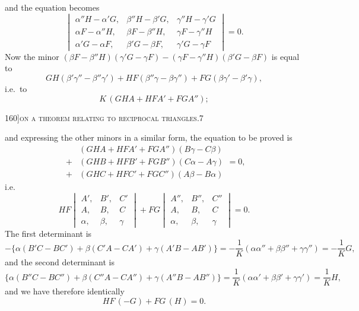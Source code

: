 \documentclass[11pt]{article}
\begin{document}
and the equation becomes
\[
\begin{vmatrix}
\alpha''H - \alpha'G, & \beta''H - \beta'G, & \gamma''H - \gamma'G\\
\alpha F - \alpha''H, & \beta F - \beta''H, & \gamma F - \gamma''H\\
\alpha'G - \alpha F, & \beta'G - \beta F, & \gamma'G - \gamma F
\end{vmatrix} = 0.
\]
Now the minor $(\beta F - \beta''H)(\gamma'G - \gamma F) - (\gamma F - \gamma''H)(\beta'G - \beta F)$ is equal to
\[
GH(\beta'\gamma'' - \beta''\gamma') + HF(\beta''\gamma - \beta\gamma'') + FG(\beta\gamma' - \beta'\gamma),
\]
i.e.\ to
\[
K\,(GHA + HFA' + FGA'');
\]

\newpage

\begin{center}
\small 160]\hfill\textsc{on a theorem relating to reciprocal triangles.}\hfill\textsc{7}
\end{center}

\medskip

\noindent and expressing the other minors in a similar form, the equation to be proved is
\[
\begin{aligned}
&(GHA + HFA' + FGA'')(B\gamma - C\beta)\\
+ &(GHB + HFB' + FGB'')(C\alpha - A\gamma)\\
+ &(GHC + HFC' + FGC'')(A\beta - B\alpha)
\end{aligned}
= 0,
\]
i.e.
\[
HF
\begin{vmatrix}
A', & B', & C'\\
A, & B, & C\\
\alpha, & \beta, & \gamma
\end{vmatrix}
+ FG
\begin{vmatrix}
A'', & B'', & C''\\
A, & B, & C\\
\alpha, & \beta, & \gamma
\end{vmatrix} = 0.
\]
The first determinant is
\[
-\{\alpha(B'C - BC') + \beta(C'A - CA') + \gamma(A'B - AB')\}
= -\frac{1}{K}(\alpha\alpha'' + \beta\beta'' + \gamma\gamma'')
= -\frac{1}{K}G,
\]
and the second determinant is
\[
\{\alpha(B''C - BC'') + \beta(C''A - CA'') + \gamma(A''B - AB'')\}
= \frac{1}{K}(\alpha\alpha' + \beta\beta' + \gamma\gamma')
= \frac{1}{K}H,
\]
and we have therefore identically
\[
HF\,(-G) + FG\,(H) = 0.
\]
\end{document}
